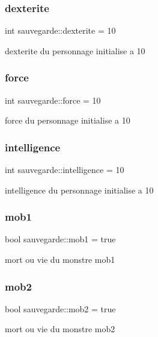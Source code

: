 \subsubsection{\texorpdfstring{dexterite}{dexterite}}
{\footnotesize\ttfamily int sauvegarde\+::dexterite = 10}

dexterite du personnage initialise a 10 \mbox{\label{classsauvegarde_a858afe68a31658d493f3f5abf4bb997a}} 
\subsubsection{\texorpdfstring{force}{force}}
{\footnotesize\ttfamily int sauvegarde\+::force = 10}

force du personnage initialise a 10 \mbox{\label{classsauvegarde_a8553de458faa853addf2c0e908c963c1}} 
\subsubsection{\texorpdfstring{intelligence}{intelligence}}
{\footnotesize\ttfamily int sauvegarde\+::intelligence = 10}

intelligence du personnage initialise a 10 \mbox{\label{classsauvegarde_a6622f2f3ed50a4cb3a318e9fe32eeec1}} 
\subsubsection{\texorpdfstring{mob1}{mob1}}
{\footnotesize\ttfamily bool sauvegarde\+::mob1 = true}

mort ou vie du monstre mob1 \mbox{\label{classsauvegarde_af6635c848e63bfa93c24386434c67823}} 
\subsubsection{\texorpdfstring{mob2}{mob2}}
{\footnotesize\ttfamily bool sauvegarde\+::mob2 = true}

mort ou vie du monstre mob2 \mbox{\label{classsauvegarde_a335355cf40458a3587c66db08951d2a8}} 
